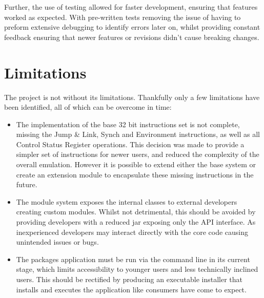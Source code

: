 Further, the use of testing allowed for faster development, ensuring that features worked as expected. With pre-written tests removing the issue of having to preform extensive debugging to identify errors later on, whilst providing constant feedback ensuring that newer features or revisions didn't cause breaking changes.

\section{Limitations}
The project is not without its limitations. Thankfully only a few limitations have been identified, all of which can be overcome in time:
\begin{itemize}
    \item The implementation of the base 32 bit instructions set is not complete, missing the Jump \& Link, Synch and Environment instructions, as well as all Control Status Register operations. This decision was made to provide a simpler set of instructions for newer users, and reduced the complexity of the overall emulation. However it is possible to extend either the base system or create an extension module to encapsulate these missing instructions in the future.

    \item The module system exposes the internal classes to external developers creating custom modules. Whilst not detrimental, this should be avoided by providing developers with a reduced jar exposing only the API interface. As inexperienced developers may interact directly with the core code causing unintended issues or bugs.

    \item The packages application must be run via the command line in its current stage, which limits accessibility to younger users and less technically inclined users. This should be rectified by producing an executable installer that installs and executes the application like consumers have come to expect.
\end{itemize}





